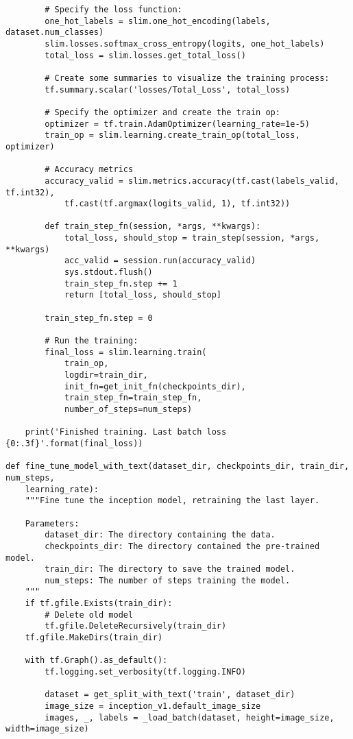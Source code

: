 \begin{lstlisting}
        # Specify the loss function:
        one_hot_labels = slim.one_hot_encoding(labels, dataset.num_classes)
        slim.losses.softmax_cross_entropy(logits, one_hot_labels)
        total_loss = slim.losses.get_total_loss()

        # Create some summaries to visualize the training process:
        tf.summary.scalar('losses/Total_Loss', total_loss)
      
        # Specify the optimizer and create the train op:
        optimizer = tf.train.AdamOptimizer(learning_rate=1e-5)
        train_op = slim.learning.create_train_op(total_loss, optimizer)

        # Accuracy metrics
        accuracy_valid = slim.metrics.accuracy(tf.cast(labels_valid, tf.int32),
            tf.cast(tf.argmax(logits_valid, 1), tf.int32))

        def train_step_fn(session, *args, **kwargs):
            total_loss, should_stop = train_step(session, *args, **kwargs)
            acc_valid = session.run(accuracy_valid)
            sys.stdout.flush()
            train_step_fn.step += 1
            return [total_loss, should_stop]
        
        train_step_fn.step = 0

        # Run the training:
        final_loss = slim.learning.train(
            train_op,
            logdir=train_dir,
            init_fn=get_init_fn(checkpoints_dir),
            train_step_fn=train_step_fn,
            number_of_steps=num_steps)
            
    print('Finished training. Last batch loss {0:.3f}'.format(final_loss))

def fine_tune_model_with_text(dataset_dir, checkpoints_dir, train_dir, num_steps, 
    learning_rate):
    """Fine tune the inception model, retraining the last layer.

    Parameters:
        dataset_dir: The directory containing the data.
        checkpoints_dir: The directory contained the pre-trained model.
        train_dir: The directory to save the trained model.
        num_steps: The number of steps training the model.
    """
    if tf.gfile.Exists(train_dir):
        # Delete old model
        tf.gfile.DeleteRecursively(train_dir)
    tf.gfile.MakeDirs(train_dir)

    with tf.Graph().as_default():
        tf.logging.set_verbosity(tf.logging.INFO)
        
        dataset = get_split_with_text('train', dataset_dir)
        image_size = inception_v1.default_image_size
        images, _, labels = _load_batch(dataset, height=image_size, width=image_size)
        

\end{lstlisting}
